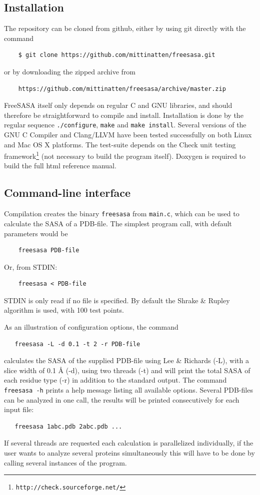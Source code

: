 \documentclass[a4paper,11pt]{article}
\begin{document}
\subsection{Installation} \label{sec:installing}

The repository can be cloned from github, either by using git directly
with the command
\begin{verbatim}
    $ git clone https://github.com/mittinatten/freesasa.git
\end{verbatim}
or by downloading the zipped archive from
\begin{verbatim}
    https://github.com/mittinatten/freesasa/archive/master.zip
\end{verbatim}
FreeSASA itself only depends on regular C and GNU libraries, and
should therefore be straightforward to compile and
install. Installation is done by the regular sequence
\verb|./configure|, \verb|make| and \verb|make install|. Several
versions of the GNU C Compiler and Clang/LLVM have been tested
successfully on both Linux and Mac OS X platforms. The test-suite
depends on the Check unit testing
framework\footnote{\texttt{http://check.sourceforge.net/}} (not
necessary to build the program itself). Doxygen is required to build
the full html reference manual.

\subsection{Command-line interface}

Compilation creates the binary \verb|freesasa| from
\verb|main.c|, which can be used to calculate the SASA of a
PDB-file. The simplest program call, with default parameters would be
\begin{verbatim}
    freesasa PDB-file
\end{verbatim}
Or, from STDIN:
\begin{verbatim} 
    freesasa < PDB-file    
\end{verbatim}
STDIN is only read if no file is specified.  By default the Shrake \&
Rupley algorithm is used, with 100 test points. 

As an illustration of configuration options, the command
\begin{verbatim}
   freesasa -L -d 0.1 -t 2 -r PDB-file
\end{verbatim}
calculates the SASA of the supplied PDB-file using Lee \& Richards
(-L), with a slice width of 0.1 Å (-d), using two threads (-t) and
will print the total SASA of each residue type (-r) in addition to the
standard output. The command \verb|freesasa -h| prints a help message
listing all available options. Several PDB-files can be analyzed in
one call, the results will be printed consecutively for each input
file:
\begin{verbatim}
   freesasa 1abc.pdb 2abc.pdb ...
\end{verbatim}
If several threads are requested each calculation is parallelized
individually, if the user wants to analyze several proteins
simultaneously this will have to be done by calling several instances
of the program.
\end{document}
